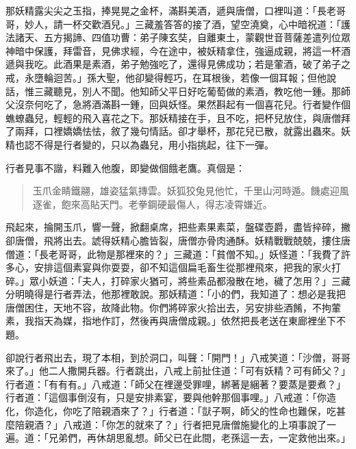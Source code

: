 那妖精露尖尖之玉指，捧晃晃之金杯，滿斟美酒，遞與唐僧，口裡叫道：「長老哥哥，妙人，請一杯交歡酒兒。」三藏羞答答的接了酒，望空澆奠，心中暗祝道：「護法諸天、五方揭諦、四值功曹：弟子陳玄奘，自離東土，蒙觀世音菩薩差遣列位眾神暗中保護，拜雷音，見佛求經，今在途中，被妖精拿住，強逼成親，將這一杯酒遞與我吃。此酒果是素酒，弟子勉強吃了，還得見佛成功；若是葷酒，破了弟子之戒，永墮輪迴苦。」孫大聖，他卻變得輕巧，在耳根後，若像一個耳報；但他說話，惟三藏聽見，別人不聞。他知師父平日好吃葡萄做的素酒，教吃他一鍾。那師父沒奈何吃了，急將酒滿斟一鍾，回與妖怪。果然斟起有一個喜花兒。行者變作個蟭蟟蟲兒，輕輕的飛入喜花之下。那妖精接在手，且不吃，把杯兒放住，與唐僧拜了兩拜，口裡嬌嬌怯怯，敘了幾句情話。卻才舉杯，那花兒已散，就露出蟲來。妖精也認不得是行者變的，只以為蟲兒，用小指挑起，往下一彈。

行者見事不諧，料難入他腹，即變做個餓老鷹。真個是：
\begin{quote}
玉爪金睛鐵翮，雄姿猛氣摶雲。妖狐狡兔見他忙，千里山河時遁。饑處迎風逐雀，飽來高貼天門。老拳鋼硬最傷人，得志凌霄嫌近。
\end{quote}

飛起來，掄開玉爪，響一聲，掀翻桌席，把些素果素菜，盤碟壺爵，盡皆捽碎，撇卻唐僧，飛將出去。諕得妖精心膽皆裂，唐僧亦骨肉通酥。妖精戰戰兢兢，摟住唐僧道：「長老哥哥，此物是那裡來的？」三藏道：「貧僧不知。」妖怪道：「我費了許多心，安排這個素宴與你耍耍，卻不知這個扁毛畜生從那裡飛來，把我的家火打碎。」眾小妖道：「夫人，打碎家火猶可，將些素品都潑散在地，穢了怎用？」三藏分明曉得是行者弄法，他那裡敢說。那妖精道：「小的們，我知道了：想必是我把唐僧困住，天地不容，故降此物。你們將碎家火拾出去，另安排些酒餚，不拘葷素，我指天為媒，指地作訂，然後再與唐僧成親。」依然把長老送在東廊裡坐下不題。

卻說行者飛出去，現了本相，到於洞口，叫聲：「開門！」八戒笑道：「沙僧，哥哥來了。」他二人撒開兵器。行者跳出，八戒上前扯住道：「可有妖精？可有師父？」行者道：「有有有。」八戒道：「師父在裡邊受罪哩，綁著是綑著？要蒸是要煮？」行者道：「這個事倒沒有，只是安排素宴，要與他幹那個事哩。」八戒道：「你造化，你造化，你吃了陪親酒來了？」行者道：「獃子啊，師父的性命也難保，吃甚麼陪親酒？」八戒道：「你怎的就來了？」行者把見唐僧施變化的上項事說了一遍。道：「兄弟們，再休胡思亂想。師父已在此間，老孫這一去，一定救他出來。」

